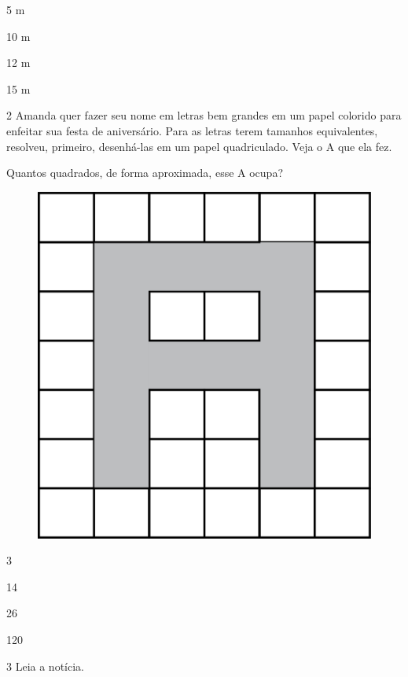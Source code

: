 \begin{escolha}
\item
  5 m
\item
  10 m
\item
  12 m
\item
  15 m
\end{escolha}

\num{2} Amanda quer fazer seu nome em letras bem grandes em um papel colorido para enfeitar sua festa de aniversário. Para as letras terem tamanhos equivalentes, resolveu, primeiro, desenhá-las em um papel quadriculado. Veja o A que ela fez.

Quantos quadrados, de forma aproximada, esse A ocupa?

\begin{figure}[htpb!]
\centering
\includegraphics[width=.8\textwidth]{./media/image62.png}
\end{figure}

\begin{escolha}
\item
  3
\item
  14
\item
  26
\item
  120
\end{escolha}

\pagebreak
\num{3} Leia a notícia.

